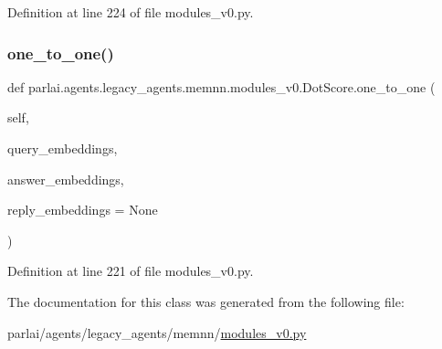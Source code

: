 Definition at line 224 of file modules\+\_\+v0.\+py.

\mbox{\label{classparlai_1_1agents_1_1legacy__agents_1_1memnn_1_1modules__v0_1_1DotScore_acf84cd9ea66c02103aae3b3ddb78c59e}} 
\subsubsection{\texorpdfstring{one\+\_\+to\+\_\+one()}{one\_to\_one()}}
{\footnotesize\ttfamily def parlai.\+agents.\+legacy\+\_\+agents.\+memnn.\+modules\+\_\+v0.\+Dot\+Score.\+one\+\_\+to\+\_\+one (\begin{DoxyParamCaption}\item[{}]{self,  }\item[{}]{query\+\_\+embeddings,  }\item[{}]{answer\+\_\+embeddings,  }\item[{}]{reply\+\_\+embeddings = {\ttfamily None} }\end{DoxyParamCaption})}



Definition at line 221 of file modules\+\_\+v0.\+py.



The documentation for this class was generated from the following file\+:\begin{DoxyCompactItemize}
\item 
parlai/agents/legacy\+\_\+agents/memnn/\hyperlink{memnn_2modules__v0_8py}{modules\+\_\+v0.\+py}\end{DoxyCompactItemize}
